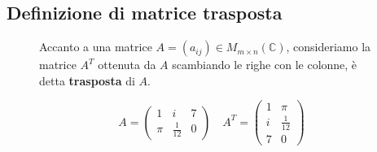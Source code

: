 \documentclass[a4paper]{article}
\theoremstyle{break}
\theoremstyle{break}
\theoremstyle{break}
\theoremstyle{break}
\begin{document}
\subsection{Definizione di matrice trasposta}
\begin{figure}[H]
  \begin{definition}
    Accanto a una matrice \( A = (a_{ij}) \in M_{m \times n}(\mathbb{C}) \), consideriamo
    la matrice \( A^T \) ottenuta da \( A \) scambiando le righe con le colonne,
    è detta \textbf{trasposta} di \( A \).
  \end{definition}
\end{figure}
\begin{figure}[H]
  \begin{example}
    \[
    A = \begin{pmatrix} 
      1 & i & 7\\
      \pi & \frac{1}{12} & 0
    \end{pmatrix} 
    \quad
    A^T = \begin{pmatrix} 
      1 & \pi \\
      i & \frac{1}{12} \\
      7 & 0
    \end{pmatrix}
    \] 
  \end{example}
\end{figure}
\end{document}
